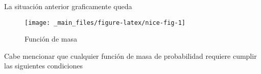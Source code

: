 \documentclass[
]{book}
\begin{document}
La situación anterior graficamente queda

\begin{figure}

{\centering \texttt{[image: \_main\_files/figure-latex/nice-fig-1]} 

}

\caption{Función de masa}\label{fig:nice-fig}
\end{figure}

Cabe mencionar que cualquier función de masa de probabilidad requiere cumplir las siguientes condiciones

  
\end{document}
